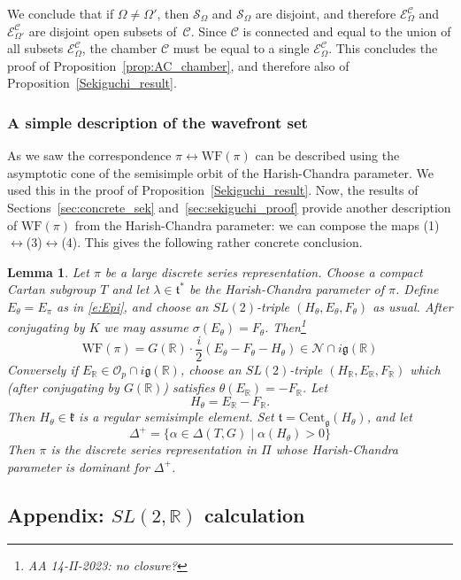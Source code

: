 \documentclass[10pt,leqno]{article}
\newtheorem{lemma}[equation]{Lemma}
\newcommand{\Cent}{\mathrm{Cent}}
\renewcommand{\O}{\mathcal O}
\newcommand{\R}{\mathbb R}
\newcommand{\N}{\mathcal N}
\renewcommand{\k}{\mathfrak k}
\renewcommand{\t}{\mathfrak t}
\newcommand{\g}{\mathfrak g}
\newcommand{\WF}{\mathrm{WF}}
\newcommand{\Op}{\O_p}
\newcommand{\ECom}{\mathcal{E}^{\mathcal{C}}_\Omega}
\begin{document}
We conclude that if $\Omega \neq \Omega'$, then $\mathcal{S}_\Omega$ and $\mathcal{S}_\Omega$ are disjoint, and therefore $\ECom$ and $\mathcal{E}^{\mathcal{C}}_{\Omega'}$ are disjoint open subsets of~$\mathcal{C}$. Since $\mathcal{C}$ is connected and equal to the union of all subsets $\mathcal{E}^{\mathcal{C}}_{\Omega}$, the chamber $\mathcal{C}$ must be equal to a single $\ECom$. This concludes the proof of Proposition~\ref{prop:AC_chamber}, and therefore also of Proposition~\ref{Sekiguchi_result}.


\subsubsection{A simple description of the wavefront set}\label{sec:alternate_WF}


As we saw the correspondence $\pi \leftrightarrow \WF(\pi)$ can be described using the asymptotic cone of the semisimple orbit of the Harish-Chandra parameter. We used this in the proof of Proposition~\ref{Sekiguchi_result}. Now, the results of Sections~\ref{sec:concrete_sek} and~\ref{sec:sekiguchi_proof} provide another description of $\WF(\pi)$ from the Harish-Chandra parameter: we can compose the maps (1)$\leftrightarrow$(3)$\leftrightarrow$(4). This gives the following rather concrete conclusion.

\begin{lemma}
  Let $\pi$ be a large discrete series representation.
Choose a compact Cartan subgroup $T$ and let $\lambda\in \t^*$ be the Harish-Chandra parameter of $\pi$.
Define $E_\theta=E_\pi$ as in \eqref{e:Epi}, and choose an $SL(2)$-triple $(H_\theta,E_\theta,F_\theta)$ as usual.
After conjugating by $K$ we may assume $\sigma(E_\theta)=F_\theta$.  Then\footnote{AA 14-II-2023: no closure?}
$$
\WF(\pi)=G(\R)\cdot\frac i2(E_\theta-F_\theta-H_\theta)\in\N\cap i\g(\R)
$$
Conversely if $E_\R\in \Op\cap i\g(\R)$, choose an $SL(2)$-triple $(H_\R,E_\R,F_\R)$ which (after conjugating by $G(\R)$) satisfies $\theta(E_\R)=-F_\R$.
Let
$$
H_\theta=E_\R-F_\R.
$$
Then $H_\theta\in\k$ is a regular semisimple element.
Set $\t=\Cent_{\g}(H_\theta)$, and let
$$
\Delta^+=\{\alpha\in\Delta(T,G)\mid  \alpha(H_\theta)>0\}
$$
Then $\pi$ is the discrete series representation in $\Pi$ whose Harish-Chandra parameter is dominant for $\Delta^+$. 
\end{lemma}


\subsection{Appendix: $SL(2,\R)$ calculation}
\end{document}
